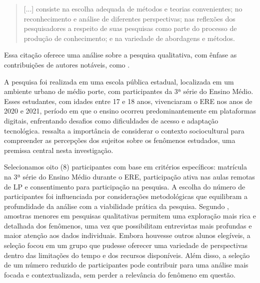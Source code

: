 \documentclass[portuguese]{textolivre}
\begin{document}
\begin{quote}
    [...] consiste na escolha adequada de métodos e teorias convenientes; no reconhecimento e análise de diferentes perspectivas; nas reflexões dos pesquisadores a respeito de suas pesquisas como parte do processo de produção de conhecimento; e na variedade de abordagens e métodos.
\end{quote}


Essa citação oferece uma análise sobre a pesquisa qualitativa, com ênfase as contribuições de autores notáveis, como \textcite{denzin2006introducao}.

A pesquisa foi realizada em uma escola pública estadual, localizada em um ambiente urbano de médio porte, com participantes da 3ª série do Ensino Médio. Esses estudantes, com idades entre 17 e 18 anos, vivenciaram o ERE nos anos de 2020 e 2021, período em que o ensino ocorreu predominantemente em plataformas digitais, enfrentando desafios como dificuldades de acesso e adaptação tecnológica. \textcite{bortoni2008} ressalta a importância de considerar o contexto sociocultural para compreender as percepções dos sujeitos sobre os fenômenos estudados, uma premissa central nesta investigação.

Selecionamos oito (8) participantes com base em critérios específicos: matrícula na 3ª série do Ensino Médio durante o ERE, participação ativa nas aulas remotas de LP e consentimento para participação na pesquisa. A escolha do número de participantes foi influenciada por considerações metodológicas que equilibram a profundidade da análise com a viabilidade prática da pesquisa. Segundo \textcite{flick2009pt}, amostras menores em pesquisas qualitativas permitem uma exploração mais rica e detalhada dos fenômenos, uma vez que possibilitam entrevistas mais profundas e maior atenção aos dados individuais. Embora houvesse outros alunos elegíveis, a seleção focou em um grupo que pudesse oferecer uma variedade de perspectivas dentro das limitações do tempo e dos recursos disponíveis. Além disso, a seleção de um número reduzido de participantes pode contribuir para uma análise mais focada e contextualizada, sem perder a relevância do fenômeno em questão.
\end{document}

